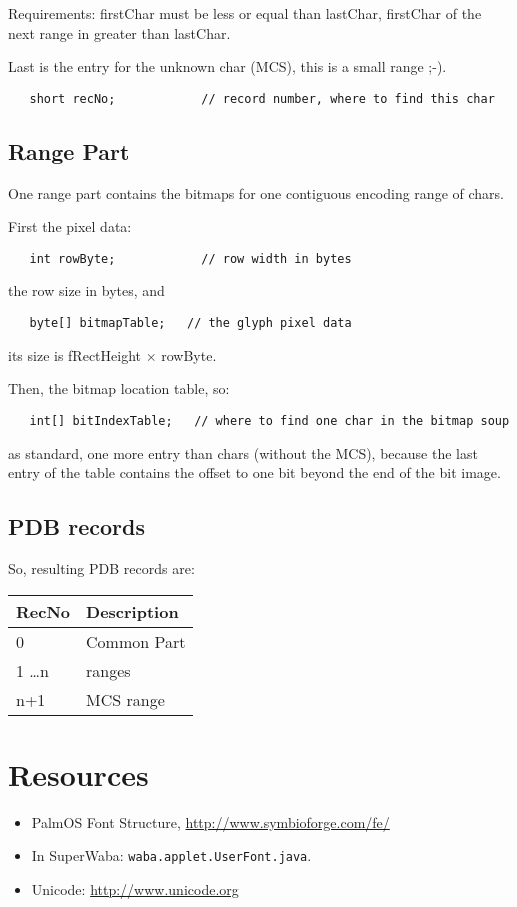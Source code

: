 \documentclass[a4paper]{article}
\begin{document}
Requirements: firstChar must be less or equal than lastChar, firstChar of the
next range in greater than lastChar.

Last is the entry for the unknown char (MCS), this is a small range ;-).
\begin{verbatim}
   short recNo;            // record number, where to find this char
\end{verbatim}


\subsection{Range Part}

One range part contains the bitmaps for one contiguous encoding range of chars.

First the pixel data:
\begin{verbatim}
   int rowByte;            // row width in bytes
\end{verbatim}
the row size in bytes, and
\begin{verbatim}
   byte[] bitmapTable;   // the glyph pixel data
\end{verbatim}

its size is fRectHeight $\times$ rowByte.

Then, the bitmap location table, so:
\begin{verbatim}
   int[] bitIndexTable;   // where to find one char in the bitmap soup
\end{verbatim}

as standard, one more entry than chars (without the MCS), because the last
entry of the table contains the offset to one bit beyond the end of the bit
image.


\subsection{PDB records}

So, resulting PDB records are:

\begin{tabular}{|l|l|}
RecNo & Description \\ \hline\hline
0 & Common Part \\ \hline
1 \ldots n & ranges \\ \hline
n+1 & MCS range \\ \hline
\end{tabular}

\section{Resources}

\begin{itemize}
\item PalmOS Font Structure, \url{http://www.symbioforge.com/fe/}
\item In SuperWaba: \verb+waba.applet.UserFont.java+.
\item Unicode: \url{http://www.unicode.org}
\end{itemize}
\end{document}

